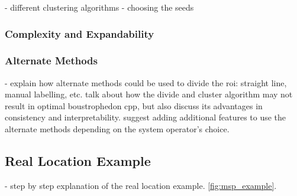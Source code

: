 - different clustering algorithms
- choosing the seeds

\subsubsection{Complexity and Expandability}

\subsubsection{Alternate Methods}

- explain how alternate methods could be used to divide the roi: straight line, manual labelling, etc. talk about how the divide and cluster algorithm may not result in optimal boustrophedon cpp, but also discuss its advantages in consistency and interpretability. suggest adding additional features to use the alternate methods depending on the system operator's choice. 

\subsection{Real Location Example}
\label{sec:msp_example}

- step by step explanation of the real location example. \ref{fig:msp_example}.

